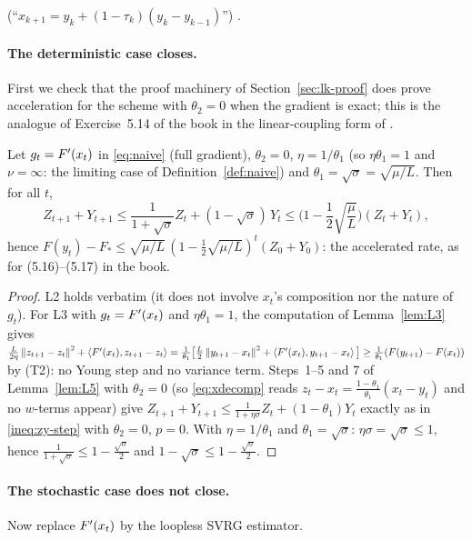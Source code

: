 \begin{remark}
(``$x_{k+1}=y_k+(1-\tau_k)(y_k-y_{k-1})$'') \cite[Section~2]{driggs2022accelerating}.
\end{remark}

\paragraph{The deterministic case closes.} First we check that the proof machinery of Section~\ref{sec:lk-proof} does prove acceleration for the scheme with $\theta_2=0$ when the gradient is exact; this is the analogue of Exercise~5.14 of the book in the linear-coupling form of \cite{allenzhu2017linear}.

\begin{proposition}[acceleration with exact gradients and $\theta_2=0$]\label{prop:agd-lc}
Let $g_t=F'(x_t)$ in \eqref{eq:naive} (full gradient), $\theta_2=0$, $\eta=1/\theta_1$ (so $\eta\theta_1=1$ and $\nu=\infty$: the limiting case of Definition~\ref{def:naive}) and $\theta_1=\sqrt\sigma=\sqrt{\mu/L}$. Then for all $t$,
\begin{equation}\label{ineq:agd-lc}
Z_{t+1}+Y_{t+1}\le\frac1{1+\sqrt\sigma}Z_t+(1-\sqrt\sigma)\,Y_t\le\Big(1-\frac12\sqrt{\frac\mu L}\Big)(Z_t+Y_t),
\end{equation}
hence $F(y_t)-F_\ast\le\sqrt{\mu/L}\,(1-\frac12\sqrt{\mu/L})^t(Z_0+Y_0)$: the accelerated rate, as for (5.16)--(5.17) in the book.
\end{proposition}

\begin{proof}
L2 holds verbatim (it does not involve $x_t$'s composition nor the nature of $g_t$). For L3 with $g_t=F'(x_t)$ and $\eta\theta_1=1$, the computation of Lemma~\ref{lem:L3} gives $\frac L{2\eta}\left\|z_{t+1}-z_t\right\|^2+\left\langle F'(x_t), z_{t+1}-z_t \right\rangle=\frac1{\theta_1}\big[\frac L2\left\|y_{t+1}-x_t\right\|^2+\left\langle F'(x_t), y_{t+1}-x_t \right\rangle\big]\ge\frac1{\theta_1}(F(y_{t+1})-F(x_t))$ by (T2): no Young step and no variance term. Steps~1--5 and 7 of Lemma~\ref{lem:L5} with $\theta_2=0$ (so \eqref{eq:xdecomp} reads $z_t-x_t=\frac{1-\theta_1}{\theta_1}(x_t-y_t)$ and no $w$-terms appear) give $Z_{t+1}+Y_{t+1}\le\frac1{1+\eta\sigma}Z_t+(1-\theta_1)Y_t$ exactly as in \eqref{ineq:zy-step} with $\theta_2=0$, $p=0$. With $\eta=1/\theta_1$ and $\theta_1=\sqrt\sigma$: $\eta\sigma=\sqrt\sigma\le1$, hence $\frac1{1+\sqrt\sigma}\le1-\frac{\sqrt\sigma}2$ and $1-\sqrt\sigma\le1-\frac{\sqrt\sigma}2$.
\end{proof}

\paragraph{The stochastic case does not close.} Now replace $F'(x_t)$ by the loopless SVRG estimator.

